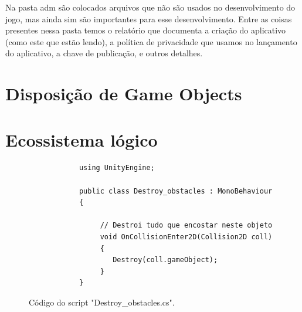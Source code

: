     Na pasta adm são colocados arquivos que não são usados no desenvolvimento do jogo, mas ainda sim são importantes para esse desenvolvimento. Entre as coisas presentes nessa pasta temos o relatório que documenta a criação do aplicativo (como este que estão lendo), a política de privacidade que usamos no lançamento do aplicativo, a chave de publicação, e outros detalhes.

    
    \section{Disposição de Game Objects}
    \section{Ecossistema lógico}

    \begin{figure}[h!]
        \centering
        \begin{lstlisting}
            using UnityEngine;

            public class Destroy_obstacles : MonoBehaviour
            {
                
                 // Destroi tudo que encostar neste objeto
                 void OnCollisionEnter2D(Collision2D coll) 
                 {
                    Destroy(coll.gameObject);
                 }
            }
        \end{lstlisting}
        \label{destruction_code}
        \caption{Código do script "Destroy\_obstacles.cs".}

    \end{figure}


